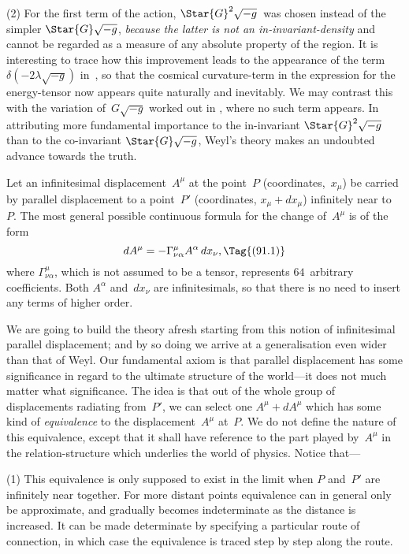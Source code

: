 \documentclass[12pt]{book}
\begin{document}
(2) For the first term of the action, $\Star{G}^{2} \sqrt{-g}$~was chosen instead of the
simpler $\Star{G} \sqrt{-g}$, \emph{because the latter is not an in-invariant-density} and cannot
be regarded as a measure of any absolute property of the region. It is
interesting to trace how this improvement leads to the appearance of the term
$\delta (-2\lambda \sqrt{-g})$ in~, so that the cosmical curvature-term in the expression
for the energy-tensor now appears quite naturally and inevitably. We may
contrast this with the variation of~$G \sqrt{-g}$ worked out in , where no such
term appears. In attributing more fundamental importance to the in-invariant
$\Star{G}^{2} \sqrt{-g}$ than to the co-invariant $\Star{G} \sqrt{-g}$, Weyl's theory makes an undoubted
advance towards the truth.


%
%
%
%

Let an infinitesimal displacement~$A^{\mu}$ at the point~$P$ (coordinates,~$x_{\mu}$) be
carried by parallel displacement to a point~$P'$ (coordinates, $x_{\mu} + dx_{\mu}$) infinitely
near to~$P$. The most general possible continuous formula for the change of~$A^{\mu}$
is of the form
\[
dA^{\mu} = -\Gamma_{\nu\alpha}^{\mu} A^{\alpha}\, dx_{\nu},
\Tag{(91.1)}
\]
where $\Gamma_{\nu\alpha}^{\mu}$, which is not assumed to be a tensor, represents $64$~arbitrary
coefficients. Both $A^{\alpha}$ and~$dx_{\nu}$ are infinitesimals, so that there is no need to
insert any terms of higher order.

We are going to build the theory afresh starting from this notion of
infinitesimal parallel displacement; and by so doing we arrive at a generalisation
even wider than that of Weyl. Our fundamental axiom is that parallel
displacement has some significance in regard to the ultimate structure of the
world---it does not much matter what significance. The idea is that out of the
whole group of displacements radiating from~$P'$, we can select one $A^{\mu} + dA^{\mu}$
which has some kind of \emph{equivalence} to the displacement~$A^{\mu}$ at~$P$. We do not
define the nature of this equivalence, except that it shall have reference to the
part played by~$A^{\mu}$ in the relation-structure which underlies the world of physics.
Notice that---

(1) This equivalence is only supposed to exist in the limit when $P$ and~$P'$
are infinitely near together. For more distant points equivalence can in general
only be approximate, and gradually becomes indeterminate as the distance is
increased. It can be made determinate by specifying a particular route of
connection, in which case the equivalence is traced step by step along the
route.
\end{document}
